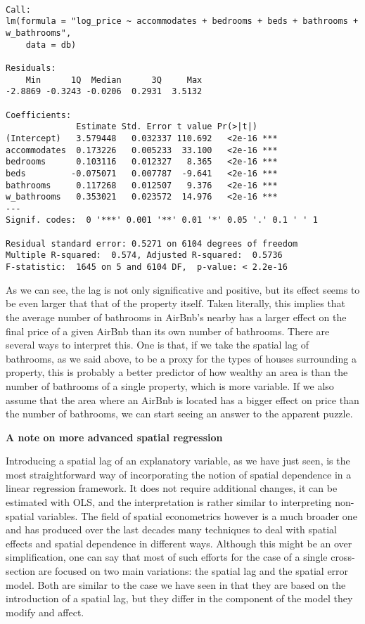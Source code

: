 \documentclass[
  letterpaper,
  krantz2]{style/krantz}
\begin{document}
\begin{verbatim}

Call:
lm(formula = "log_price ~ accommodates + bedrooms + beds + bathrooms + w_bathrooms", 
    data = db)

Residuals:
    Min      1Q  Median      3Q     Max 
-2.8869 -0.3243 -0.0206  0.2931  3.5132 

Coefficients:
              Estimate Std. Error t value Pr(>|t|)    
(Intercept)   3.579448   0.032337 110.692   <2e-16 ***
accommodates  0.173226   0.005233  33.100   <2e-16 ***
bedrooms      0.103116   0.012327   8.365   <2e-16 ***
beds         -0.075071   0.007787  -9.641   <2e-16 ***
bathrooms     0.117268   0.012507   9.376   <2e-16 ***
w_bathrooms   0.353021   0.023572  14.976   <2e-16 ***
---
Signif. codes:  0 '***' 0.001 '**' 0.01 '*' 0.05 '.' 0.1 ' ' 1

Residual standard error: 0.5271 on 6104 degrees of freedom
Multiple R-squared:  0.574, Adjusted R-squared:  0.5736 
F-statistic:  1645 on 5 and 6104 DF,  p-value: < 2.2e-16
\end{verbatim}

As we can see, the lag is not only significative and positive, but its
effect seems to be even larger that that of the property itself. Taken
literally, this implies that the average number of bathrooms in AirBnb's
nearby has a larger effect on the final price of a given AirBnb than its
own number of bathrooms. There are several ways to interpret this. One
is that, if we take the spatial lag of bathrooms, as we said above, to
be a proxy for the types of houses surrounding a property, this is
probably a better predictor of how wealthy an area is than the number of
bathrooms of a single property, which is more variable. If we also
assume that the area where an AirBnb is located has a bigger effect on
price than the number of bathrooms, we can start seeing an answer to the
apparent puzzle.

\textbf{A note on more advanced spatial regression}

Introducing a spatial lag of an explanatory variable, as we have just
seen, is the most straightforward way of incorporating the notion of
spatial dependence in a linear regression framework. It does not require
additional changes, it can be estimated with OLS, and the interpretation
is rather similar to interpreting non-spatial variables. The field of
spatial econometrics however is a much broader one and has produced over
the last decades many techniques to deal with spatial effects and
spatial dependence in different ways. Although this might be an over
simplification, one can say that most of such efforts for the case of a
single cross-section are focused on two main variations: the spatial lag
and the spatial error model. Both are similar to the case we have seen
in that they are based on the introduction of a spatial lag, but they
differ in the component of the model they modify and affect.
\end{document}
